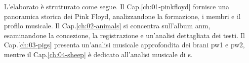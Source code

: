 \documentclass[class=book, crop=false, oneside, 12pt]{standalone}
\begin{document}
L'elaborato è strutturato come segue. Il Cap.\ref{ch:01-pinkfloyd} fornisce una panoramica storica dei Pink Floyd, analizzandone la formazione, i membri e il profilo musicale. Il Cap.\ref{ch:02-animals} si concentra sull'album \acrlong{anm}, esaminandone la concezione, la registrazione e un'analisi dettagliata dei testi. Il Cap.\ref{ch:03-pigs} presenta un'analisi musicale approfondita dei brani \acrlong{pw1} e \acrlong{pw2}, mentre il Cap.\ref{ch:04-sheep} è dedicato all'analisi musicale di \acrlong{s}.
\end{document}
